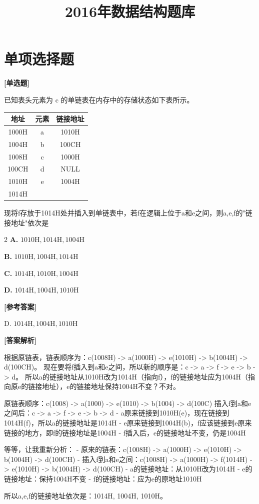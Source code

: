 \documentclass[12pt,a4paper]{article}
\title{\textbf{2016年数据结构题库} \\ \large }
\author{}
\date{}
\newenvironment{choicequestion}[1][]{%
    \vspace{0.5cm}
    \noindent\textbf{[#1]}
    \vspace{0.2cm}
}{}
\newenvironment{answersection}{%
    \vspace{0.2cm}
    \noindent\textbf{[参考答案]}\\
    \vspace{0.1cm}
}{}
\newenvironment{analysissection}{%
    \vspace{0.2cm}
    \noindent\textbf{[答案解析]}\\
    \vspace{0.1cm}
}{}
\newcounter{questioncounter}
\newcommand{\question}[2]{%
    \stepcounter{questioncounter}%
    \noindent\textbf{\thequestioncounter} #1%
}
\newcommand{\choices}[4]{%
    \begin{multicols}{2}
    \noindent \textbf{A.} #1 \par
    \noindent \textbf{B.} #2 \par
    \noindent \textbf{C.} #3 \par
    \noindent \textbf{D.} #4 \par
    \end{multicols}%
}
\begin{document}
\maketitle

\section{单项选择题}

\begin{choicequestion}[单选题]
\question{已知表头元素为 c 的单链表在内存中的存储状态如下表所示。\newline

\begin{table}[h]
\centering
\begin{tabular}{|c|c|c|}
\hline
地址 & 元素 & 链接地址 \\
\hline
1000H & a & 1010H \\
\hline
1004H & b & 100CH \\
\hline
1008H & c & 1000H \\
\hline
100CH & d & NULL \\
\hline
1010H & e & 1004H \\
\hline
1014H & & \\
\hline
\end{tabular}
\end{table}\newline

现将f存放于1014H处并插入到单链表中，若f在逻辑上位于a和e之间，则a,e,f的"链接地址"依次是}{D}
\choices{$1010\mathrm{H}, 1014\mathrm{H}, 1004\mathrm{H}$}{$1010\mathrm{H}, 1004\mathrm{H}, 1014\mathrm{H}$}{$1014\mathrm{H}, 1010\mathrm{H}, 1004\mathrm{H}$}{$1014\mathrm{H}, 1004\mathrm{H}, 1010\mathrm{H}$}

\begin{answersection}
D. $1014\mathrm{H}, 1004\mathrm{H}, 1010\mathrm{H}$
\end{answersection}

\begin{analysissection}
根据原链表，链表顺序为：c(1008H) -> a(1000H) -> e(1010H) -> b(1004H) -> d(100CH)。
现在要将f插入到a和e之间，所以新的顺序是：c -> a -> f -> e -> b -> d。
所以a的链接地址从1010H改为1014H（指向f），f的链接地址应为1004H（指向原e的链接地址），e的链接地址保持1004H不变？不对。

原链表顺序：c(1008) -> a(1000) -> e(1010) -> b(1004) -> d(100C)
插入f到a和e之间后：c -> a -> f -> e -> b -> d
- a原来链接到1010H(e)，现在链接到1014H(f)，所以a的链接地址是1014H
- e原来链接到1004H(b)，f应该链接到e原来链接的地方，即f的链接地址是1004H
- f插入后，e的链接地址不变，仍是1004H

等等，让我重新分析：
- 原来的链表：c(1008H) -> a(1000H) -> e(1010H) -> b(1004H) -> d(100CH)
- 插入f到a和e之间：c(1008H) -> a(1000H) -> f(1014H) -> e(1010H) -> b(1004H) -> d(100CH)
- a的链接地址：从1010H改为1014H
- e的链接地址：保持1004H不变
- f的链接地址：应为e的原地址1010H

所以a,e,f的链接地址依次是：1014H, 1004H, 1010H。
\end{analysissection}
\end{choicequestion}
\end{document}
